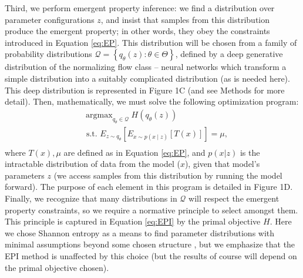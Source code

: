 \documentclass[11pt]{article}
\DeclareMathOperator*{\argmax}{argmax}
\begin{document}
Third, we perform emergent property inference: we find a distribution over parameter configurations $z$, and insist that samples from this distribution produce the emergent property; in other words, they obey the constraints introduced in Equation \ref{eq:EP}.  
This distribution will be chosen from a family of probability distributions $\mathcal{Q} = \left\{ q_\theta(z) : \theta \in \Theta \right\}$, defined by a deep generative distribution
of the normalizing flow class \cite{rezende2015variational, dinh2016density, papamakarios2017masked} -- neural networks which transform a simple distribution into a suitably complicated distribution (as is needed here).  
This deep distribution is represented in Figure 1C (and see Methods for more detail).  
Then, mathematically, we must solve the following optimization program: 
 \begin{equation} \label{eq:EPI}
\begin{split}
&\argmax_{q_\theta \in \mathcal{Q}} H(q_\theta(z)) \\
 &\text{  s.t.  } E_{z \sim q_\theta}\left[ E_{x\sim p(x \mid z)}\left[T(x)\right] \right] = \mu, \\
\end{split}
\end{equation}
where $T(x), \mu$ are defined as in Equation \ref{eq:EP}, and $p(x|z)$ is the intractable distribution of data from the model ($x$), given that model's parameters $z$ (we access samples from this distribution by running the model forward).   The purpose of each element in this program is detailed in Figure 1D.
Finally, we recognize that many distributions in $\mathcal{Q}$ will respect the emergent property constraints, so we require a normative principle to select amongst them.  
This principle is captured in Equation \ref{eq:EPI} by the primal objective $H$.  
Here we chose Shannon entropy as a means to find parameter distributions with minimal assumptions beyond some chosen structure \cite{jaynes1957information, elsayed2017structure, loaiza2017maximum, savin2017maximum}, but we emphasize that the EPI method is unaffected by this choice (but the results of course will depend on the primal objective chosen).  
\end{document}
